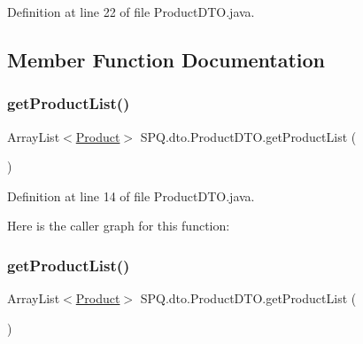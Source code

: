 Definition at line 22 of file Product\+D\+T\+O.\+java.



\subsection{Member Function Documentation}
\mbox{\label{class_s_p_q_1_1dto_1_1_product_d_t_o_a4b7df5983f4342285d495a335fb9019f}} 
\subsubsection{\texorpdfstring{get\+Product\+List()}{getProductList()}\hspace{0.1cm}{\footnotesize\ttfamily [1/2]}}
{\footnotesize\ttfamily Array\+List$<$\mbox{\hyperlink{class_s_p_q_1_1data_1_1_product}{Product}}$>$ S\+P\+Q.\+dto.\+Product\+D\+T\+O.\+get\+Product\+List (\begin{DoxyParamCaption}{ }\end{DoxyParamCaption})}



Definition at line 14 of file Product\+D\+T\+O.\+java.

Here is the caller graph for this function\+:
\mbox{\label{class_s_p_q_1_1dto_1_1_product_d_t_o_a4b7df5983f4342285d495a335fb9019f}} 
\subsubsection{\texorpdfstring{get\+Product\+List()}{getProductList()}\hspace{0.1cm}{\footnotesize\ttfamily [2/2]}}
{\footnotesize\ttfamily Array\+List$<$\mbox{\hyperlink{class_s_p_q_1_1data_1_1_product}{Product}}$>$ S\+P\+Q.\+dto.\+Product\+D\+T\+O.\+get\+Product\+List (\begin{DoxyParamCaption}{ }\end{DoxyParamCaption})}



